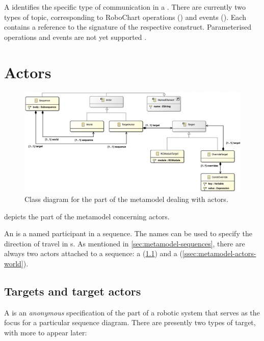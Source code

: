 A \mmessagetopic{} identifies the specific type of communication in a
\mmessagespec{}.  There are currently two types of topic, corresponding to
RoboChart operations (\moperationmessagetopic) and events (\meventmessagetopic).
Each contains a reference to the signature of the respective construct.
Parameterised operations and events are not yet supported .


\section{Actors}\label{sec:metamodel-actors}

\begin{figure}
	\centering
	\includegraphics[width=\textwidth]{diagrams/actors.png}
	\caption{Class diagram for the part of the \langname{} metamodel dealing with actors.}
	\label{fig:metamodel-actors}
\end{figure}

 depicts the part of the metamodel concerning
actors.

An \mactor{} is a named participant in a sequence.  The names can be used to
specify the direction of travel in \mmessagespec{}s.
As mentioned in
\cref{sec:metamodel-sequences}, there are always two actors
attached to a sequence: a \mtargetactor{} (\cref{ssec:metamodel-actors-target})
and a \mworld{} (\cref{ssec:metamodel-actors-world}).

\subsection{Targets and target actors}\label{ssec:metamodel-actors-target}

A \mtarget{} is an \emph{anonymous} specification of the part of a robotic
system that serves as the focus for a particular sequence diagram.  There are
presently two types of target, with more to appear later:

